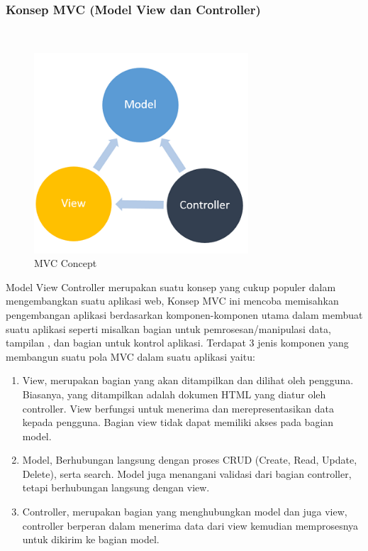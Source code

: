 \subsubsection{Konsep MVC (Model View dan Controller)}
\hfill\\
	\begin{figure}[H]
		\includegraphics[width=8cm]{figures/web/mvc.png}
		\centering
		\caption{MVC Concept}
	\end{figure}
Model View Controller merupakan suatu konsep yang cukup populer dalam mengembangkan suatu aplikasi web, Konsep MVC ini mencoba memisahkan pengembangan aplikasi berdasarkan komponen-komponen utama dalam membuat suatu aplikasi seperti misalkan bagian untuk pemrosesan/manipulasi data, tampilan , dan bagian untuk kontrol aplikasi. Terdapat 3 jenis komponen yang membangun suatu pola MVC dalam suatu aplikasi yaitu: 
\begin{enumerate}
	\item View, merupakan bagian yang akan ditampilkan dan dilihat oleh pengguna. Biasanya, yang ditampilkan adalah dokumen HTML yang diatur oleh controller. View berfungsi untuk menerima dan merepresentasikan data kepada pengguna. Bagian view tidak dapat memiliki akses pada bagian model.
	\item Model, Berhubungan langsung dengan proses CRUD (Create, Read, Update, Delete), serta search. Model juga menangani validasi dari bagian controller, tetapi berhubungan langsung dengan view.
	\item Controller, merupakan bagian yang menghubungkan model dan juga view, controller berperan dalam menerima data dari view kemudian memprosesnya untuk dikirim ke bagian model.
\end{enumerate}

